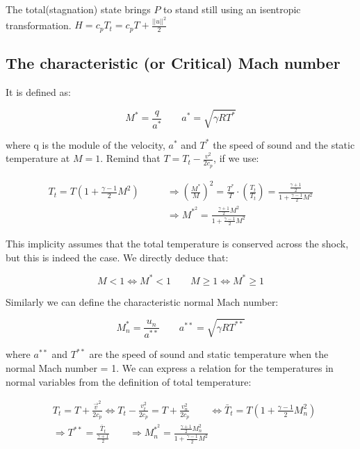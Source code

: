 \documentclass[british,french,11pt, a4paper, openany]{article}
\begin{document}
The total(stagnation) state brings $P$ to stand still using an isentropic transformation. $H=c_pT_t=c_pT+\frac{||u||^2}{2}$

\subsection{The characteristic (or Critical) Mach number}
It is defined as: 

\begin{equation}
M^* = \frac{q}{a^*} \qquad a^* = \sqrt{\gamma R T^*}
\end{equation}

where q is the module of the velocity, $a^*$ and $T^*$ the speed of sound and the static temperature at $M=1$. Remind that $T = T_t - \frac{v^2}{2c_p}$, if we use: 

\begin{equation}
\begin{aligned}
T_t = T \left(1+ \frac{\gamma - 1}{2}M^2 \right) \qquad &\Rightarrow \left( \frac{M^*}{M}\right)^2 = \frac{T^*}{T} \cdot \left( \frac{T_t}{T_t}\right) = \frac{\frac{\gamma + 1}{2}}{1+ \frac{\gamma -1}{2}M^2}\\
&\Rightarrow M^{*^2} =  \frac{\frac{\gamma + 1}{2}M^2}{1+ \frac{\gamma -1}{2}M^2}
\end{aligned}
\label{eq:8.74}
\end{equation}

This implicity assumes that the total temperature is conserved across the shock, but this is indeed the case. We directly deduce that: 

\begin{equation}
M < 1 \Leftrightarrow M^* <1 \qquad M \geq 1 \Leftrightarrow M^* \geq 1
\label{eq:8.75}
\end{equation}

Similarly we can define the characteristic normal Mach number: 

\begin{equation}
M^*_n = \frac{u_n }{a^{**}} \qquad a^{**}  = \sqrt{\gamma R T^{**}}
\end{equation}

where $a^{**}$ and $T^{**}$ are the speed of sound and static temperature when the normal Mach number = 1. We can express a relation for the temperatures in normal variables from the definition of total temperature: 

\begin{equation}
\begin{aligned}
&T_t = T + \frac{\vec{v}^2}{2c_p} \Leftrightarrow T_t - \frac{v_t^2}{2c_p} = T + \frac{v_n^2}{2c_p}\qquad \Leftrightarrow \bar{T}_t = T\left(1 + \frac{\gamma -1}{2}M^2_n \right)\\
&\Rightarrow T^{**}= \frac{\bar{T}_t}{\frac{\gamma +1}{2}}\qquad \Rightarrow M^{*^2}_n = \frac{\frac{\gamma +1}{2}M^2_n}{1+ \frac{\gamma -1}{2}M^2}
\end{aligned}
\end{equation}
\end{document}
